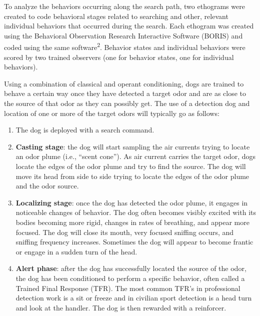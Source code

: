 \documentclass[
]{article}
\providecommand{\tightlist}{%
  \setlength{\itemsep}{0pt}\setlength{\parskip}{0pt}}
\begin{document}
To analyze the behaviors occurring along the search path, two ethograms were created to code behavioral stages related to searching and other, relevant individual behaviors that occurred during the search. Each ethogram was created using the Behavioral Observation Research Interactive Software (BORIS) and coded using the same software\textsuperscript{2}. Behavior states and individual behaviors were scored by two trained observers (one for behavior states, one for individual behaviors).

Using a combination of classical and operant conditioning, dogs are trained to behave a certain way once they have detected a target odor and are as close to the source of that odor as they can possibly get. The use of a detection dog and location of one or more of the target odors will typically go as follows:

\begin{enumerate}
\def\labelenumi{\arabic{enumi}.}
\tightlist
\item
  The dog is deployed with a search command.\\
\item
  \textbf{Casting stage}: the dog will start sampling the air currents trying to locate an odor plume (i.e., ``scent cone''). As air current carries the target odor, dogs locate the edges of the odor plume and try to find the source. The dog will move its head from side to side trying to locate the edges of the odor plume and the odor source.
\item
  \textbf{Localizing stage}: once the dog has detected the odor plume, it engages in noticeable changes of behavior. The dog often becomes visibly excited with its bodies becoming more rigid, changes in rates of breathing, and appear more focused. The dog will close its mouth, very focused sniffing occurs, and sniffing frequency increases. Sometimes the dog will appear to become frantic or engage in a sudden turn of the head.
\item
  \textbf{Alert phase}: after the dog has successfully located the source of the odor, the dog has been conditioned to perform a specific behavior, often called a Trained Final Response (TFR). The most common TFR's in professional detection work is a sit or freeze and in civilian sport detection is a head turn and look at the handler. The dog is then rewarded with a reinforcer.
\end{enumerate}
\end{document}
